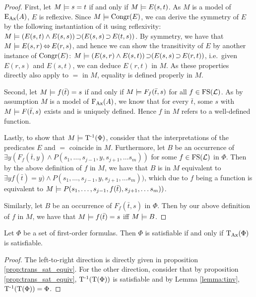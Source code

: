 \begin{proof}
	First, let $M\models s = t$ if and only if $M\models E(s, t)$.
	As $M$ is a model of $\operatorname{E_{Ax}}(A)$, $E$ is reflexive. 
	Since $M \models \operatorname{Congr}(E)$, we can derive the symmetry of $E$ by the following instantiation of it using reflexivity:
	$M \entails (E(s, t) \land E(s, s)) \limpl ( E(s, s) \limpl\nolinebreak E(t, s))$.
	By symmetry, we have that $M \models E(s, r) \operatorname{\Leftrightarrow} E(r, s)$, and hence we can show the transitivity of $E$ by another instance of $\operatorname{Congr}(E)$: 
	$M \entails (E(s, r) \land E(s, t)) \limpl ( E(s, s) \limpl\nolinebreak E(r, t))$, i.e.\ given $E(r, s)$ and $E(s, t)$, we can deduce $E(r, t)$ in $M$.
	As these properties directly also apply to $=$ in $M$, equality is defined properly in $M$.

	Second, let $M\models f(\bar t) = s$ if and only if $M\models F_f(\bar t, s)$ for all $f \in \operatorname{FS}(\operatorname{\mathcal{L}})$.
	As by assumption $M$ is a model of $\operatorname{F_{Ax}}(A)$, we know that for every $\bar t$, some $s$ with $M\models F(\bar t, s)$ exists and is uniquely defined.
	Hence $f$ in $M$ refers to a well-defined function.

	Lastly, to show that $M \models \operatorname{T^{-1}}(\Phi)$, 
	consider that the interpretations of the predicates $E$ and $=$ coincide in $M$.
	Furthermore, let $B$ be an occurrence of $\exists y (F_f(\bar t, y) \land P(s_1, \ldots, s_{j-1}, y, s_{j+1}, \ldots s_m))$ for some $f \in \operatorname{FS}(\operatorname{\mathcal{L}})$ in $\Phi$.
	Then by the above definition of $f$ in $M$, we have that $B$ is in $M$ equivalent to $\exists y f(\bar t) = y) \land P(s_1, \ldots, s_{j-1}, y, s_{j+1}, \ldots s_m))$, which due to $f$ being a function is equivalent to 
	$M \models P(s_1, \ldots, s_{j-1}, f(\bar t), s_{j+1}, \ldots s_m))$.

	Similarly, let $B$ be an occurrence of $F_f(\bar t, s)$ in $\Phi$.
	Then by our above definition of $f$ in $M$, we have that $M \models f(\bar t) = s$ iff $M \models B$.
\end{proof}

\begin{corr}
	Let $\Phi$ be a set of first-order formulas.
	Then $\Phi$ is satisfiable if and only if $\operatorname{\operatorname{T}_{Ax}}(\Phi)$ is satisfiable.
\end{corr}
\begin{proof}
	The left-to-right direction is directly given in proposition \ref{prop:trans_sat_equiv}.
	For the other direction, consider that by proposition \ref{prop:trans_sat_equiv}, $\operatorname{T^{-1}}(\operatorname{T}(\Phi))$ is satisfiable and by Lemma \ref{lemma:tinv}, $\operatorname{T^{-1}}(\operatorname{T}(\Phi)) = \Phi$.
\end{proof}



